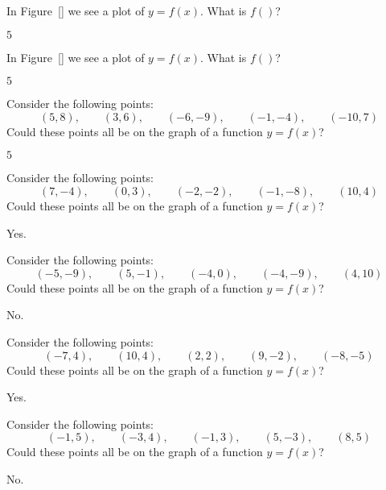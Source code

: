 \begin{exercises}

\begin{exercise} 
In Figure~\ref{} we see a plot of $y=f(x)$. What is $f()$?
\begin{answer}
$5$
\end{answer}
\end{exercise}


\begin{exercise} 
In Figure~\ref{} we see a plot of $y=f(x)$. What is $f()$?
\begin{answer}
$5$
\end{answer}
\end{exercise}


\begin{exercise} Consider the following points:
\[
(5,8),\qquad (3,6), \qquad(-6,-9), \qquad(-1,-4), \qquad(-10,7)
\]
Could these points all be on the graph of a function $y =f(x)$?
\begin{answer}
$5$
\end{answer}
\end{exercise}


\begin{exercise} Consider the following points:
\[
(7,-4),\qquad (0,3), \qquad(-2,-2), \qquad(-1,-8), \qquad(10,4)
\]
Could these points all be on the graph of a function $y =f(x)$?
\begin{answer}
Yes.
\end{answer}
\end{exercise}


\begin{exercise} Consider the following points:
\[
(-5,-9),\qquad (5,-1), \qquad(-4,0), \qquad(-4,-9), \qquad(4,10)
\]
Could these points all be on the graph of a function $y =f(x)$?
\begin{answer}
No. 
\end{answer}
\end{exercise}

\begin{exercise} Consider the following points:
\[
(-7,4),\qquad (10,4), \qquad(2,2), \qquad(9,-2), \qquad(-8,-5)
\]
Could these points all be on the graph of a function $y =f(x)$?
\begin{answer}
Yes. 
\end{answer}
\end{exercise}


\begin{exercise} Consider the following points:
\[
(-1,5),\qquad (-3,4), \qquad(-1,3), \qquad(5,-3), \qquad(8,5)
\]
Could these points all be on the graph of a function $y =f(x)$?
\begin{answer}
No.
\end{answer}
\end{exercise}


\end{exercises}
